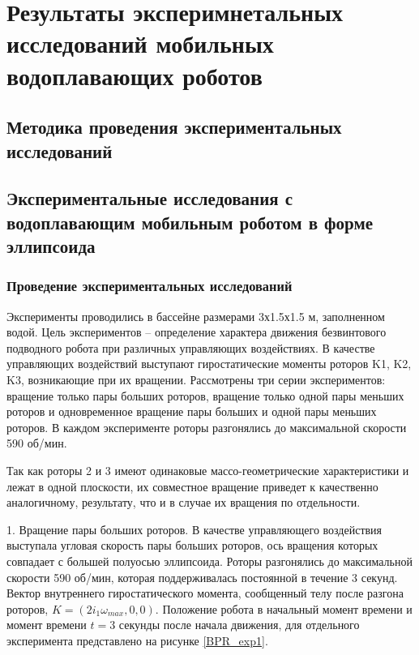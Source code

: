 \chapter{Результаты эксперимнетальных исследований мобильных водоплавающих роботов}\label{ch:ch4}

\section{Методика проведения экспериментальных исследований}\label{sec:ch4/sec1}

\section{Экспериментальные исследования с водоплавающим мобильным роботом в форме эллипсоида}\label{sec:ch4/sec2}

\subsection{Проведение экспериментальных исследований}\label{subsec:ch4/sec2/sub1}

Эксперименты проводились в бассейне размерами 3х1.5х1.5 м, заполненном водой. Цель экспериментов -- определение характера движения безвинтового подводного робота при различных управляющих воздействиях. В качестве управляющих воздействий выступают гиростатические моменты роторов K1, K2, K3, возникающие при их вращении. Рассмотрены три серии экспериментов: вращение только пары больших роторов, вращение только одной пары меньших роторов и одновременное вращение пары больших и одной пары меньших роторов. В каждом эксперименте роторы разгонялись до максимальной скорости 590 об/мин.

Так как роторы 2 и 3 имеют одинаковые массо-геометрические характеристики и лежат в одной плоскости, их совместное вращение приведет к качественно аналогичному, результату, что и в случае их вращения по отдельности.


1.	Вращение пары больших роторов. В качестве управляющего воздействия выступала угловая скорость пары больших роторов, ось вращения которых совпадает с большей полуосью эллипсоида. Роторы разгонялись до максимальной скорости 590 об/мин, которая поддерживалась постоянной в течение 3 секунд. Вектор внутреннего гиростатического момента, сообщенный телу после разгона роторов, $K = (2i_1\omega_{max}, 0, 0)$. Положение робота в начальный момент времени и момент времени $t=3$ секунды после начала движения, для отдельного эксперимента представлено на рисунке \ref{BPR_exp1}.

